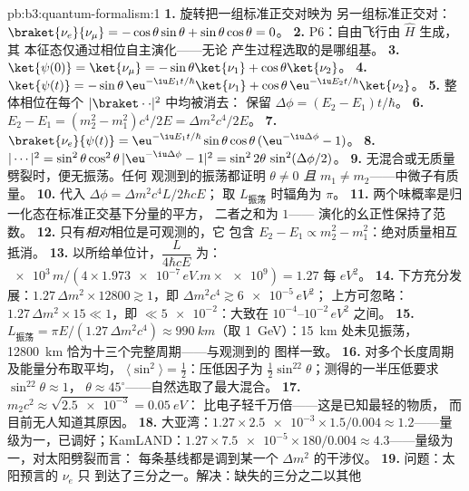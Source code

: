 \begin{solution}{pb:b3:quantum-formalism:1}
\textbf{1.} 旋转把一组标准正交对映为
另一组标准正交对：$\braket{\nu_e}{\nu_\mu} = -\cos\theta\sin\theta +
\sin\theta\cos\theta = 0$。
\textbf{2.} P6：自由飞行由 $\hat H$ 生成，其
本征态仅通过相位自主演化——无论
产生过程选取的是哪组基。
\textbf{3.} $\ket{\psi(0)} = \ket{\nu_\mu} = -\sin\theta\ket{\nu_1}
+ \cos\theta\ket{\nu_2}$。
\textbf{4.} $\ket{\psi(t)} = -\sin\theta\,\eu^{-\iu E_1t/\hbar}
\ket{\nu_1} + \cos\theta\,\eu^{-\iu E_2t/\hbar}\ket{\nu_2}$。
\textbf{5.} 整体相位在每个 $|\braket\cdot\cdot|^2$ 中均被消去：
保留 $\Delta\phi = (E_2 - E_1)t/\hbar$。
\textbf{6.} $E_2 - E_1 = (m_2^2 - m_1^2)c^4/2E = \Delta m^2c^4/2E$。
\textbf{7.} $\braket{\nu_e}{\psi(t)} = \eu^{-\iu E_1t/\hbar}
\sin\theta\cos\theta\,(\eu^{-\iu\Delta\phi} - 1)$。
\textbf{8.} $|\cdots|^2 = \sin^2\theta\cos^2\theta\,|{\eu^{-\iu
\Delta\phi} - 1}|^2 = \sin^22\theta\,\sin^2(\Delta\phi/2)$。
\textbf{9.} 无混合或无质量劈裂时，便无振荡。任何
观测到的振荡都证明 $\theta \neq 0$ \emph{且} $m_1 \neq
m_2$——中微子有质量。
\textbf{10.} 代入 $\Delta\phi = \Delta m^2c^4L/2\hbar cE$；
取 $L_{\text{振荡}}$ 时辐角为 $\pi$。
\textbf{11.} 两个味概率是归一化态在标准正交基下分量的平方，
二者之和为 $1$——
演化的幺正性保持了范数。
\textbf{12.} 只有\emph{相对}相位是可观测的，它
包含 $E_2 - E_1 \propto m_2^2 - m_1^2$：绝对质量相互抵消。
\textbf{13.} 以所给单位计，$\dfrac{L}{4\hbar cE}$ 为：
$\num{e3}\,\unit{m}/(4 \times \num{1.973e-7}\,\unit{eV.m} \times
\num{e9}) = 1.27$ 每 $\unit{eV^2}$。
\textbf{14.} 下方充分发展：$1.27\,\Delta m^2 \times 12800
\gtrsim 1$，即 $\Delta m^2c^4 \gtrsim \num{6e-5}\,\unit{eV^2}$；
上方可忽略：$1.27\,\Delta m^2 \times 15 \ll 1$，即 $\ll
\num{5e-2}$：大致在 $10^{-4}$--$10^{-2}\,\unit{eV^2}$ 之间。
\textbf{15.} $L_{\text{振荡}} = \pi E/(1.27\,\Delta m^2c^4) \approx
\qty{990}{km}$（取 \qty{1}{GeV}）：\qty{15}{km} 处未见振荡，
\qty{12800}{km} 恰为十三个完整周期——与观测到的
图样一致。
\textbf{16.} 对多个长度周期及能量分布取平均，
$\langle\sin^2\rangle = \tfrac12$：压低因子为 $\tfrac12\sin^22
\theta$；测得的一半压低要求 $\sin^22\theta \approx 1$，
$\theta \approx 45^\circ$——自然选取了最大混合。
\textbf{17.} $m_2c^2 \approx \sqrt{\num{2.5e-3}} = \qty{0.05}{eV}$：
比电子轻千万倍——这是已知最轻的物质，
而目前无人知道其原因。
\textbf{18.} 大亚湾：$1.27 \times \num{2.5e-3} \times 1.5/0.004
\approx 1.2$——量级为一，已调好；KamLAND：$1.27 \times
\num{7.5e-5} \times 180/0.004 \approx 4.3$——量级为一，对太阳劈裂而言：
每条基线都是调到某一个
$\Delta m^2$ 的干涉仪。
\textbf{19.} 问题：太阳预言的 $\nu_e$ 只
到达了三分之一。解决：缺失的三分之二以其他

\end{solution}
